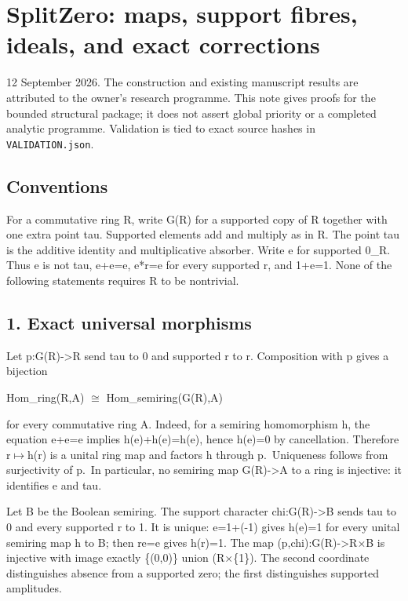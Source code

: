 \section{SplitZero: maps, support fibres, ideals, and exact
corrections}\label{InheritedStructuralStage:splitzero-maps-support-fibres-ideals-and-exact-corrections}

12 September 2026. The construction and existing manuscript results are
attributed to the owner's research programme. This note gives proofs for
the bounded structural package; it does not assert global priority or a
completed analytic programme. Validation is tied to exact source hashes
in \texttt{VALIDATION.json}.

\subsection{Conventions}\label{InheritedStructuralStage:conventions}

For a commutative ring R, write G(R) for a supported copy of R together
with one extra point tau. Supported elements add and multiply as in R.
The point tau is the additive identity and multiplicative absorber.
Write e for supported 0\_R. Thus e is not tau, e+e=e, e*r=e for every
supported r, and 1+e=1. None of the following statements requires R to
be nontrivial.

\subsection{1. Exact universal
morphisms}\label{InheritedStructuralStage:exact-universal-morphisms}

Let p:G(R)-\textgreater R send tau to 0 and supported r to r.
Composition with p gives a bijection

Hom\_ring(R,A) \ensuremath{\cong} Hom\_semiring(G(R),A)

for every commutative ring A. Indeed, for a semiring homomorphism h, the
equation e+e=e implies h(e)+h(e)=h(e), hence h(e)=0 by cancellation.
Therefore r\ensuremath{\mapsto}h(r) is a unital ring map and factors h through
p.~Uniqueness follows from surjectivity of p.~In particular, no semiring
map G(R)-\textgreater A to a ring is injective: it identifies e and tau.

Let B be the Boolean semiring. The support character
chi:G(R)-\textgreater B sends tau to 0 and every supported r to 1. It is
unique: e=1+(-1) gives h(e)=1 for every unital semiring map h to B; then
re=e gives h(r)=1. The map (p,chi):G(R)-\textgreater R×B is injective
with image exactly \{(0,0)\} union (R×\{1\}). The second coordinate
distinguishes absence from a supported zero; the first distinguishes
supported amplitudes.

